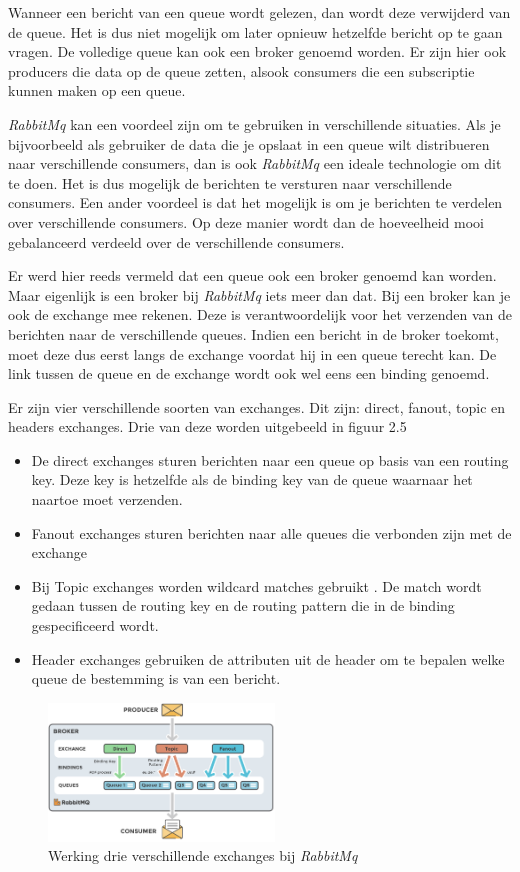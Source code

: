 Wanneer een bericht van een queue wordt gelezen, dan wordt deze verwijderd van de queue. Het is dus niet mogelijk om later opnieuw hetzelfde bericht op te gaan vragen. De volledige queue kan ook een broker genoemd worden. Er zijn hier ook producers die data op de queue zetten, alsook consumers die een subscriptie kunnen maken op een queue. 

\emph{RabbitMq} kan een voordeel zijn om te gebruiken in verschillende situaties. Als je bijvoorbeeld als gebruiker de data die je opslaat in een queue wilt distribueren naar verschillende consumers, dan is ook \emph{RabbitMq} een ideale technologie om dit te doen. Het is dus mogelijk de berichten te versturen naar verschillende consumers. Een ander voordeel is dat het mogelijk is om je berichten te verdelen over verschillende consumers. Op deze manier wordt dan de hoeveelheid mooi gebalanceerd verdeeld over de verschillende consumers.

Er werd hier reeds vermeld dat een queue ook een broker genoemd kan worden. Maar eigenlijk is een broker bij \emph{RabbitMq} iets meer dan dat. Bij een broker kan je ook de exchange mee rekenen. Deze is verantwoordelijk voor het verzenden van de berichten naar de verschillende queues. Indien een bericht in de broker toekomt, moet deze dus eerst langs de exchange voordat hij in een queue terecht kan. De link tussen de queue en de exchange wordt ook wel eens een binding genoemd.

Er zijn vier verschillende soorten van exchanges. Dit zijn: direct, fanout, topic en headers exchanges. Drie van deze worden uitgebeeld in figuur 2.5 \begin{itemize}
    \item De direct exchanges sturen berichten naar een queue op basis van een routing key. Deze key is hetzelfde als de binding key van de queue waarnaar het naartoe moet verzenden. 
    \item Fanout exchanges sturen berichten naar alle queues die verbonden zijn met de exchange
    \item Bij Topic exchanges worden wildcard matches gebruikt . De match wordt gedaan tussen de routing key en de routing pattern die in de binding gespecificeerd wordt.
    \item Header exchanges gebruiken de attributen uit de header om te bepalen welke queue de bestemming is van een bericht.
\end{itemize}
 \begin{figure}[h!]
    \centering
    \includegraphics[width=60mm]{../rabbitmqExchanges.png}
    \caption{Werking drie verschillende exchanges bij \emph{RabbitMq}}
    
\end{figure}
\autocite{Johansson2015}
